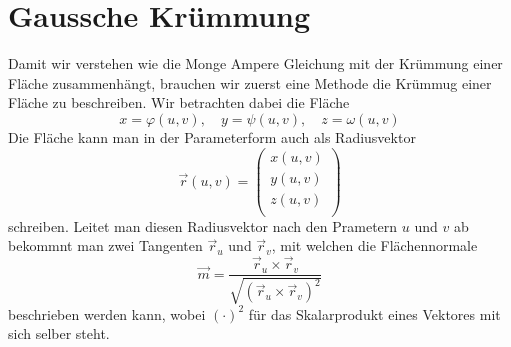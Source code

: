 %
%
%
%
\section{Gaussche Krümmung
\label{mongeampere:section:teil1}}
Damit wir verstehen wie die Monge Ampere Gleichung mit der 
Krümmung einer Fläche zusammenhängt, brauchen wir zuerst eine Methode die 
Krümmug einer Fläche zu beschreiben.
Wir betrachten dabei die Fläche
\begin{equation}
  x = \varphi(u,v), \quad y = \psi(u,v), \quad z = \omega(u,v)
  \label{mongeampere:areaparam}
\end{equation}
Die Fläche kann man in der Parameterform auch als Radiusvektor
\begin{equation}
  \vec r (u, v) =
  \begin{pmatrix}
    x(u,v) \\
    y(u,v) \\
    z(u,v) \\
  \end{pmatrix}
  \label{mongeampere:rad}
\end{equation}
schreiben.
Leitet man diesen Radiusvektor nach den Prametern $u$ und $v$ ab bekommnt man zwei Tangenten
$\vec r_u$ und $\vec r_v$,
mit welchen die Flächennormale 
\begin{equation}
  \vec m = \frac{\vec r_u \times \vec r_v}{\sqrt{(\vec r_u \times \vec r_v)^2}} 
  \label{mongeampere:norm}
\end{equation}
beschrieben werden kann, wobei $(\cdot)^2$ für das Skalarprodukt eines Vektores mit sich selber steht.



